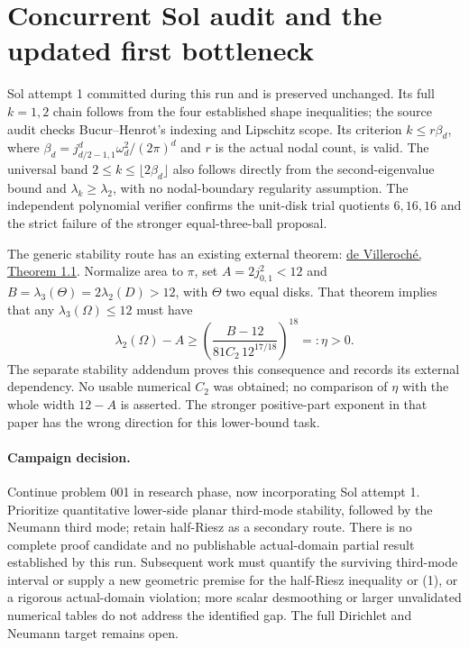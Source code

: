 \documentclass[11pt]{article}
\begin{document}
\section{Concurrent Sol audit and the updated first bottleneck}
Sol attempt 1 committed during this run and is preserved unchanged. Its
full $k=1,2$ chain follows from the four established shape inequalities;
the source audit checks Bucur--Henrot's indexing and Lipschitz scope.
Its criterion $k\leq r\beta_d$, where
$\beta_d=j_{d/2-1,1}^d\omega_d^2/(2\pi)^d$ and $r$ is the actual nodal
count, is valid. The universal band $2\leq k\leq\lfloor2\beta_d\rfloor$
also follows directly from the second-eigenvalue bound and
$\lambda_k\geq\lambda_2$, with no nodal-boundary regularity assumption.
The independent polynomial verifier confirms the unit-disk trial quotients
$6,16,16$ and the strict failure of the stronger equal-three-ball proposal.

The generic stability route has an existing external theorem:
\href{https://arxiv.org/html/2506.05870v3}{de Villeroch\'e, Theorem 1.1}.
Normalize area to $\pi$, set $A=2j_{0,1}^2<12$ and
$B=\lambda_3(\Theta)=2\lambda_2(D)>12$, with $\Theta$ two equal disks.
That theorem implies that any $\lambda_3(\Omega)\leq12$ must have
\[
 \lambda_2(\Omega)-A\geq
 \left(\frac{B-12}{81C_2\,12^{17/18}}\right)^{18}=:\eta>0.
\]
The separate stability addendum proves this consequence and records its
external dependency. No usable numerical $C_2$ was obtained; no comparison
of $\eta$ with the whole width $12-A$ is asserted. The stronger
positive-part exponent in that paper has the wrong direction for this
lower-bound task.

\paragraph{Campaign decision.}
Continue problem 001 in research phase, now incorporating Sol attempt 1.
Prioritize quantitative lower-side planar third-mode stability, followed
by the Neumann third mode; retain half-Riesz as a secondary route.
There is no complete proof
candidate and no publishable actual-domain partial result established by
this run. Subsequent work must quantify the surviving third-mode interval
or supply a new geometric premise for the
half-Riesz inequality or (1), or a rigorous actual-domain violation; more
scalar desmoothing or larger unvalidated numerical tables do not address
the identified gap. The full Dirichlet and Neumann target remains open.
\end{document}
